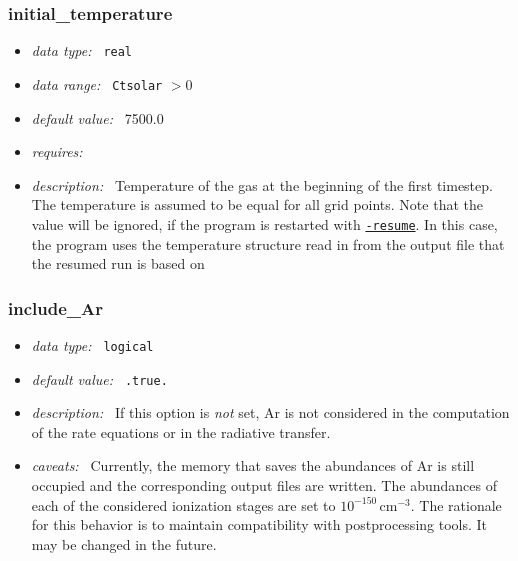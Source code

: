 \documentclass[a4paper,10pt]{article}
\begin{document}
\subsubsection{initial\_temperature}
\label{opt:initialtemperature}
\begin{itemize}
 \item \textit{data type:~} \texttt{real}
 \item \textit{data range:~} \texttt{Ctsolar} $> 0$
 \item \textit{default value:~} 7500.0
 \item \textit{requires:~}
 \item \textit{description:~} Temperature of the gas at the beginning of the 
  first timestep. The temperature is assumed to be equal for all grid points.
  Note that the value will be ignored, if the program is restarted with
  \texttt{\hyperref[sec:commandlineoptions]{-resume}}. In this case, the 
  program uses the temperature structure  read in from the output file that the 
  resumed run is  based on
\end{itemize}


\subsubsection{include\_Ar}
\label{opt:includear}
\begin{itemize}
 \item \textit{data type:~} \texttt{logical}
 \item \textit{default value:~} \texttt{.true.}
 \item \textit{description:~} If this option is 
 \textit{not} set, Ar is not considered 
 in the computation of the rate equations or in the
 radiative transfer. 
 \item \textit{caveats:~} Currently, the memory that saves the 
 abundances of Ar is still occupied and the corresponding output
 files are written. The abundances of each of the considered ionization
 stages are set to $10^{-150}\,\mathrm{cm^{-3}}$. The rationale for
 this behavior is to maintain compatibility with postprocessing
 tools. It may be changed in the future.
\end{itemize}
\end{document}
